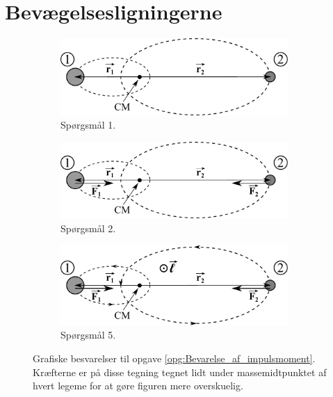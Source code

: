 \section*{Bevægelsesligningerne}
%
%
\begin{figure}
	\centering
	\begin{subfigure}{0.49\textwidth}
		\centering
		\includegraphics[width=0.95\textwidth]{Planetbevaegelse/Bevarelse_af_impulsmoment_spg1}
		\caption{Spørgsmål 1.}
		\label{fig:Bevarelse_af_impulsmoment_spg1}
	\end{subfigure}
	\hfill
	\vspace{5mm}
	\begin{subfigure}{0.49\textwidth}
		\centering
		\includegraphics[width=0.95\textwidth]{Planetbevaegelse/Bevarelse_af_impulsmoment_spg2}
		\caption{Spørgsmål 2.}
		\label{fig:Bevarelse_af_impulsmoment_spg2}
	\end{subfigure}
	\begin{subfigure}{0.70\textwidth}
		\centering
		\includegraphics[width=0.95\textwidth]{Planetbevaegelse/Bevarelse_af_impulsmoment_spg5}
		\caption{Spørgsmål 5.}
		\label{fig:Bevarelse_af_impulsmoment_spg5}
	\end{subfigure}
	\caption{Grafiske besvarelser til opgave \ref{opg:Bevarelse_af_impulsmoment}. Kræfterne er på disse tegning tegnet lidt under massemidtpunktet af hvert legeme for at gøre figuren mere overskuelig.}
	\label{fig:Bevarelse_af_impulsmoment}
\end{figure}
